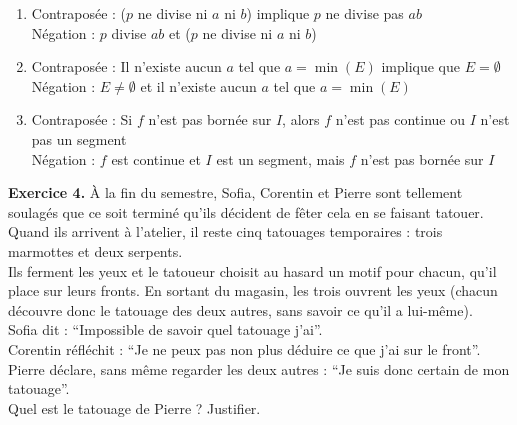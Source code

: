 \documentclass[a4paper, 10pt]{report}
\begin{document}
	\colorbox{solution}
	{
		\begin{minipage}{0.9\textwidth}
			\begin{enumerate}[label=\arabic*.]
				\item Contraposée : ($p$ ne divise ni $a$ ni $b$) 
				implique $p$ ne divise pas $ab$\\
				Négation :  $p$ divise $ab$
					et ($p$ ne divise ni $a$ ni $b$)
				\item Contraposée :  Il n'existe aucun $a$ tel que
					$a = \min(E)$ implique que $E = \emptyset$\\
				Négation : $E \neq \emptyset$
					et il n'existe aucun $a$ tel que $a = \min(E)$
				\item Contraposée : Si $f$ n'est pas bornée sur $I$,
					alors $f$ n'est pas continue
					ou $I$ n'est pas un segment\\
				Négation : $f$ est continue et $I$ est un segment,
					mais $f$ n'est pas bornée sur $I$
			\end{enumerate}
		\end{minipage}
	}
	
	\newpage
	
	\fancyhf{}
	\renewcommand{\headrule}
	{\rule{\textwidth}{0pt}}
	
	\noindent
	\textbf{Exercice 4.} 
	À la fin du semestre, Sofia, Corentin et Pierre sont tellement soulagés que ce soit terminé qu’ils décident de fêter cela en se faisant tatouer.\\
	Quand ils arrivent à l’atelier, il reste cinq tatouages temporaires : trois marmottes et deux serpents.\\
	Ils ferment les yeux et le tatoueur choisit au hasard un motif pour chacun, qu’il place sur leurs fronts. En sortant du magasin, les trois ouvrent les yeux (chacun découvre donc le tatouage des deux autres, sans savoir ce qu’il a lui-même).\\
	\indent Sofia dit : “Impossible de savoir quel tatouage j’ai”.\\
	\indent Corentin réfléchit : “Je ne peux pas non plus déduire ce que j’ai sur le front”.\\
	\indent Pierre déclare, sans même regarder les deux autres : “Je suis donc certain de mon tatouage”.\\
	Quel est le tatouage de Pierre ? Justifier.
	
\end{document}
